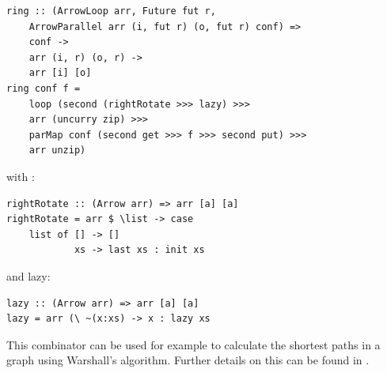 \begin{lstlisting}[frame=htrbl]
ring :: (ArrowLoop arr, Future fut r,
	ArrowParallel arr (i, fut r) (o, fut r) conf) =>
    conf ->
    arr (i, r) (o, r) ->
    arr [i] [o]
ring conf f =
	loop (second (rightRotate >>> lazy) >>>
    arr (uncurry zip) >>>
    parMap conf (second get >>> f >>> second put) >>>
    arr unzip)
\end{lstlisting}
with :
\begin{lstlisting}[frame=htrbl]
rightRotate :: (Arrow arr) => arr [a] [a]
rightRotate = arr $ \list -> case
	list of [] -> []
			xs -> last xs : init xs
\end{lstlisting}
and lazy:
\begin{lstlisting}[frame=htrbl]			
lazy :: (Arrow arr) => arr [a] [a]
lazy = arr (\ ~(x:xs) -> x : lazy xs
\end{lstlisting}
This combinator can be used for example to calculate the shortest paths in a graph using Warshall's algorithm. Further details on this can be found in \cite{eden_cefp}.
